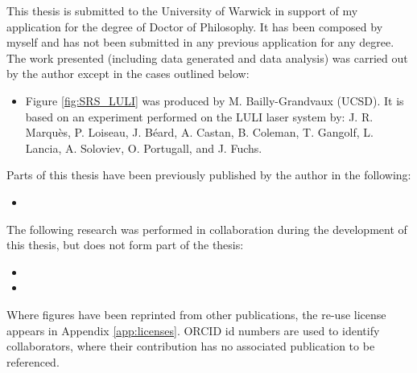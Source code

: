 
\begin{thesisdeclaration}
%

This thesis is submitted to the University of Warwick in support of my application for the degree of Doctor of Philosophy. It has been composed by myself and has not been submitted in any previous application for any degree. \\


\noindent The work presented (including data generated and data analysis) was carried out by the author except in the cases outlined below:
\begin{singlespacing}
\begin{itemize}
    \item Figure \ref{fig:SRS_LULI} was produced by M. Bailly-Grandvaux (UCSD). It is based on an experiment performed on the LULI laser system by: J. R. Marqu\`es, P. Loiseau, J. B\'eard, A. Castan, B. Coleman, T. Gangolf, L. Lancia, A. Soloviev, O. Portugall, and J. Fuchs.  
\end{itemize}{}
\end{singlespacing}

\noindent Parts of this thesis have been previously published by the author in the following:
\begin{singlespacing}
\begin{itemize}
    \item {}
\end{itemize}{}
\end{singlespacing}

\noindent The following research was performed in collaboration during the development of this thesis, but does not form part of the thesis:
\begin{singlespacing}
\begin{itemize}
\item {}
	\item {}
\end{itemize}
\end{singlespacing}

\noindent Where figures have been reprinted from other publications, the re-use license appears in Appendix \ref{app:licenses}. ORCID id numbers are used to identify collaborators, where their contribution has no associated publication to be referenced.

\end{thesisdeclaration}

